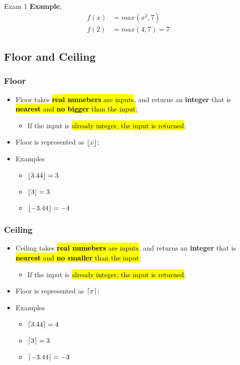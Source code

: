 \documentclass{note}
\DeclarePairedDelimiter\floor{\lfloor}{\rfloor}
\DeclarePairedDelimiter\ceil{\lceil}{\rceil}
\begin{document}
\begin{note}{Exam 1}
        \textbf{Example}, 
        \begin{align*}
            f(x) &= max\left( x^{2}, 7 \right)\\
            f(2) &= max\left( 4, 7 \right) = 7
        \end{align*}

        \subsection{Floor and Ceiling}
        \subsubsection{Floor}
        \begin{itemize}
            \item Floor takes \hl{\textbf{real numebers} are inputs}, and returns an \textbf{integer} that is 
            \hl{\textbf{nearest} and \textbf{no bigger} than the input};
            \begin{itemize}
                \item If the input is \hl{already integer, the input is returned};
            \end{itemize}
            \item Floor is represented as $ \floor*{x} $;
            \item Examples
            \begin{itemize}
                \item $ \floor*{3.44} = 3 $
                \item $ \floor*{3} = 3 $
                \item $ \floor*{-3.44} = -4 $
            \end{itemize}
        \end{itemize}

        \subsubsection{Ceiling}
        \begin{itemize}
            \item Ceiling takes \hl{\textbf{real numebers} are inputs}, and returns an \textbf{integer} that is 
            \hl{\textbf{nearest} and \textbf{no smaller} than the input};
            \begin{itemize}
                \item If the input is \hl{already integer, the input is returned};
            \end{itemize}
            \item Floor is represented as $ \ceil*{x} $;
            \item Examples
            \begin{itemize}
                \item $ \ceil*{3.44} = 4 $
                \item $ \ceil*{3} = 3 $
                \item $ \ceil*{-3.44} = -3 $
            \end{itemize}
        \end{itemize}


\end{note}
\end{document}
